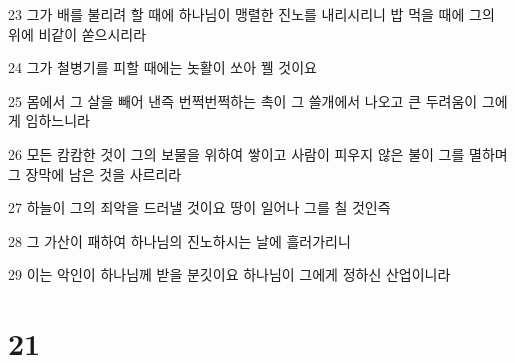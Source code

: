\par 23 그가 배를 불리려 할 때에 하나님이 맹렬한 진노를 내리시리니 밥 먹을 때에 그의 위에 비같이 쏟으시리라
\par 24 그가 철병기를 피할 때에는 놋활이 쏘아 꿸 것이요
\par 25 몸에서 그 살을 빼어 낸즉 번쩍번쩍하는 촉이 그 쓸개에서 나오고 큰 두려움이 그에게 임하느니라
\par 26 모든 캄캄한 것이 그의 보물을 위하여 쌓이고 사람이 피우지 않은 불이 그를 멸하며 그 장막에 남은 것을 사르리라
\par 27 하늘이 그의 죄악을 드러낼 것이요 땅이 일어나 그를 칠 것인즉
\par 28 그 가산이 패하여 하나님의 진노하시는 날에 흘러가리니
\par 29 이는 악인이 하나님께 받을 분깃이요 하나님이 그에게 정하신 산업이니라

\chapter{21}

